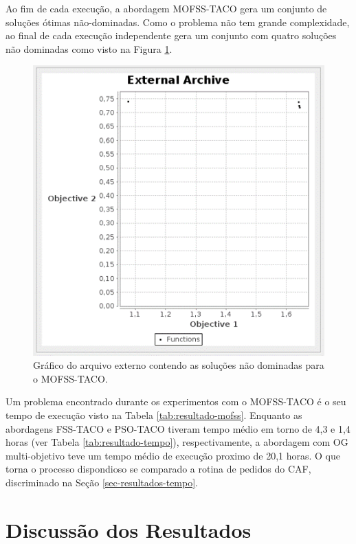 Ao fim de cada execução, a abordagem MOFSS-TACO gera um conjunto de soluções ótimas não-dominadas. Como o problema não tem grande complexidade, ao final de cada execução independente gera um conjunto com quatro soluções não dominadas como visto na Figura \ref{fig:mofsstaco-pareto}.

\begin{figure}[!htb]
    \centering
    \caption{Gráfico do arquivo externo contendo as soluções não dominadas para o MOFSS-TACO.} \label{fig:mofsstaco-pareto}
    \includegraphics[scale=1.0]{imagens/mofss-taco-pareto.png}
\end{figure}

Um problema encontrado durante os experimentos com o MOFSS-TACO é o seu tempo de execução visto na Tabela \ref{tab:resultado-mofss}. Enquanto as abordagens FSS-TACO e PSO-TACO tiveram tempo médio em torno de 4,3 e 1,4 horas (ver Tabela \ref{tab:resultado-tempo}), respectivamente, a abordagem com OG multi-objetivo teve um tempo médio de execução proximo de 20,1 horas. O que torna o processo dispondioso se comparado a rotina de pedidos do CAF, discriminado na Seção \ref{sec-resultados-tempo}.

\section{Discussão dos Resultados}

